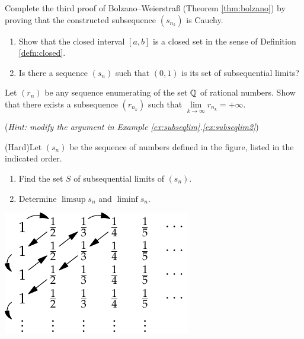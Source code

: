 \begin{exercises}{}{}
\begin{enumerate}
		
		\item\label{exs:bolzano} Complete the third proof of Bolzano--Weierstraß (Theorem \ref{thm:bolzano})  by proving that the constructed subsequence $(s_{n_k})$ is Cauchy.
  
  
  	\item%
  	\begin{enumerate}
  		\item Show that the closed interval $[a,b]$ is a closed set in the sense of Definition \ref{defn:closed}.
  		\item Is there a sequence $(s_n)$ such that $(0,1)$ is its set of subsequential limits?
  	\end{enumerate}
  
  
  	\item%
  	Let $(r_n)$ be any sequence enumerating of the set $\mathbb{Q}$ of rational numbers. Show that there exists a subsequence $(r_{n_k})$ such that $\lim\limits_{k\to\infty}r_{n_k}=+\infty$.\par
  	(\emph{Hint: modify the argument in Example \ref*{ex:subseqlim}.\ref{ex:subseqlim2}})
  
  
  	\begin{minipage}[t]{0.55\linewidth}\vspace{0pt}
  	\item%
  	(Hard)\lstsp Let $(s_n)$ be the sequence of numbers defined in the figure, listed in the indicated order.
  	\begin{enumerate}
		  \item Find the set $S$ of subsequential limits of $(s_n)$.
		  \item Determine $\limsup s_n$ and $\liminf s_n$.
	  \end{enumerate}
  	\end{minipage}\begin{minipage}[t]{0.44\linewidth}\vspace{0pt}
  		\hfill\includegraphics{diag-arg}
  	\end{minipage}
  
  


	\end{enumerate}
\end{exercises}

